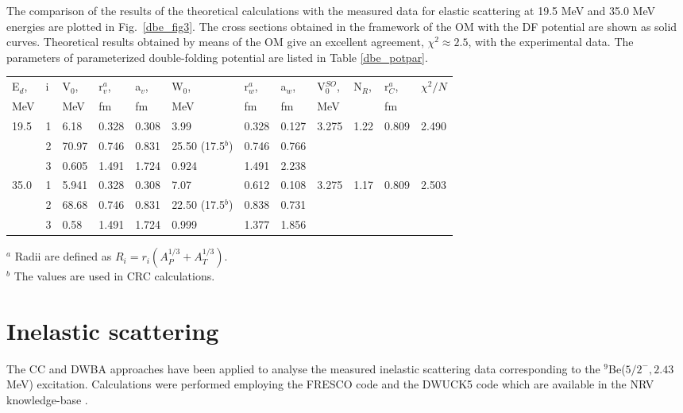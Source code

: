 \documentclass[
12pt, %
oneside, %
english, %
onehalfspacing, %
onehalfspacing, %
headsepline, %
]{MastersDoctoralThesis} %
\begin{document}
The comparison of the results of the theoretical calculations with  the measured data for elastic scattering at 19.5 MeV and 35.0 MeV energies are plotted in Fig.~\ref{dbe_fig3}. 
The cross sections obtained in the framework of the OM with the DF potential are shown as solid curves. 
Theoretical results obtained by means of the OM give an excellent agreement, $\chi^2\approx2.5$, with the experimental data. The  parameters of  parameterized double-folding potential are listed in Table \ref{dbe_potpar}. 

\begin{table*}[bp]
\footnotesize
\caption{\label{dbe_potpar} \footnotesize Parameterized double-folding potentials of the $d$+$^9$Be system used in the OM, CC and DWBA calculations.}
\begin{tabular*}{\textwidth}{ll@{\extracolsep{\fill}}llllllllll}
\toprule
E$_d$, & i & V$_0$, & r$_v^{a}$, & a$_v$, & W$_0$, & r$_w^{a}$, & a$_w$, & V$_0^{SO}$, & N$_R$, & r$_C^{a}$, & $\chi^2/N$ \\
MeV   &   & MeV   & fm    & fm    & MeV   & fm    & fm    & MeV        &       & fm   						& \\ \midrule
19.5  & 1 & 6.18  & 0.328 & 0.308 & 3.99  & 0.328 & 0.127 & 3.275      & 1.22  & 0.809 			& 	2.490	\\
      & 2 & 70.97 & 0.746 & 0.831 & 25.50 (17.5$^{b}$) & 0.746 & 0.766 &            &       &    						&   \\
      & 3 & 0.605 & 1.491 & 1.724 & 0.924 & 1.491 & 2.238 &            &       &   							&    \\ \midrule
35.0  & 1 & 5.941 & 0.328 & 0.308 & 7.07  & 0.612 & 0.108 & 3.275      & 1.17  & 0.809 			&	2.503\\
      & 2 & 68.68 & 0.746 & 0.831 & 22.50 (17.5$^{b}$)& 0.838 & 0.731 &            &       &       						&\\
      & 3 & 0.58  & 1.491 & 1.724 & 0.999 & 1.377 & 1.856 &            &       &      							& \\ \bottomrule
\end{tabular*}
\scriptsize
$^{a}$ Radii are defined as $R_i = r_i \left( A^{1/3}_P+A^{1/3}_T \right)$.  \\
$^{b}$ The values are used in CRC calculations. \\
\end{table*}


\section{Inelastic scattering}
The CC and DWBA approaches have been applied to analyse the measured inelastic scattering data corresponding to the ${}^9$Be($5/2^-, 2.43$ MeV) excitation. Calculations were performed employing the FRESCO code \cite{fresco} and the DWUCK5 code \cite{kunz} which are available in the NRV knowledge-base \cite{nrv}.
\end{document}
